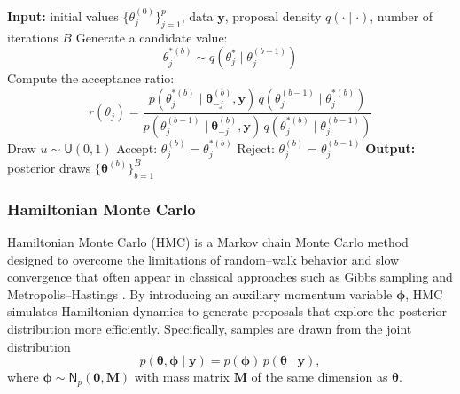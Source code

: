 \begin{algorithm}[H]
\caption{Metropolis--Hastings (MH)}
\begin{algorithmic}
\State \textbf{Input:} initial values $\{\theta_j^{(0)}\}_{j=1}^p$, data $\bm{y}$, proposal density $q(\cdot\mid\cdot)$, number of iterations $B$
    \State Generate a candidate value:
    \[
      \theta_j^{*(b)} \sim q\!\left(\theta_j^{*}\mid\theta_j^{(b-1)}\right)
    \]
    \State Compute the acceptance ratio:
    \[
      r(\theta_j) = 
      \frac{
        p\!\left(\theta_j^{*(b)} \mid \bm{\theta}_{-j}^{(b)},\bm{y}\right)\,
        q\!\left(\theta_j^{(b-1)}\mid\theta_j^{*(b)}\right)
      }{
        p\!\left(\theta_j^{(b-1)} \mid \bm{\theta}_{-j}^{(b)},\bm{y}\right)\,
        q\!\left(\theta_j^{*(b)}\mid\theta_j^{(b-1)}\right)
      }
    \]
    \State Draw $u \sim \mathsf{U}(0,1)$
      \State Accept: $\theta_j^{(b)} = \theta_j^{*(b)}$
    \Else
      \State Reject: $\theta_j^{(b)} = \theta_j^{(b-1)}$
    \EndIf
  \EndFor
\EndFor
\State \textbf{Output:} posterior draws $\{\bm{\theta}^{(b)}\}_{b=1}^B$
\end{algorithmic}
\end{algorithm}

\subsubsection{Hamiltonian Monte Carlo}

Hamiltonian Monte Carlo (HMC) is a Markov chain Monte Carlo method designed to overcome the limitations of random--walk behavior and slow convergence that often appear in classical approaches such as Gibbs sampling and Metropolis--Hastings \cite{GELMAN14}. By introducing an auxiliary momentum variable $\bm{\phi}$, HMC simulates Hamiltonian dynamics to generate proposals that explore the posterior distribution more efficiently. Specifically, samples are drawn from the joint distribution
\begin{equation}
p(\bm{\theta},\bm{\phi}\mid\bm{y}) = p(\bm{\phi})\,p(\bm{\theta}\mid\bm{y}),
\end{equation}
where $\bm{\phi}\sim \mathsf{N}_p(\bm{0},\bm{M})$ with mass matrix $\bm{M}$ of the same dimension as $\bm{\theta}$.


